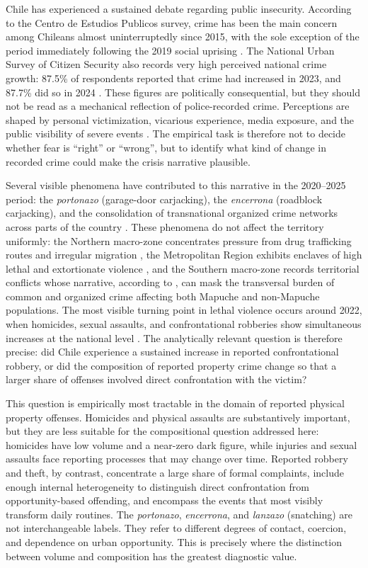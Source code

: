 \documentclass[pdflatex,sn-basic]{sn-jnl}
\begin{document}
Chile has experienced a sustained debate regarding public insecurity. According to the Centro de Estudios Publicos survey, crime has been the main concern among Chileans almost uninterruptedly since 2015, with the sole exception of the period immediately following the 2019 social uprising \citep{cep2025}. The National Urban Survey of Citizen Security also records very high perceived national crime growth: 87.5\% of respondents reported that crime had increased in 2023, and 87.7\% did so in 2024 \citep{ine2025enusc}. These figures are politically consequential, but they should not be read as a mechanical reflection of police-recorded crime. Perceptions are shaped by personal victimization, vicarious experience, media exposure, and the public visibility of severe events \citep{dominguez2024,gamarra2024b}. The empirical task is therefore not to decide whether fear is ``right'' or ``wrong'', but to identify what kind of change in recorded crime could make the crisis narrative plausible.

Several visible phenomena have contributed to this narrative in the 2020--2025 period: the \textit{portonazo} (garage-door carjacking), the \textit{encerrona} (roadblock carjacking), and the consolidation of transnational organized crime networks across parts of the country \citep{greene2023,bravo2024}. These phenomena do not affect the territory uniformly: the Northern macro-zone concentrates pressure from drug trafficking routes and irregular migration \citep{bravo2024}, the Metropolitan Region exhibits enclaves of high lethal and extortionate violence \citep{dammert2025}, and the Southern macro-zone records territorial conflicts whose narrative, according to \citet{izquierdo2024}, can mask the transversal burden of common and organized crime affecting both Mapuche and non-Mapuche populations. The most visible turning point in lethal violence occurs around 2022, when homicides, sexual assaults, and confrontational robberies show simultaneous increases at the national level \citep{crespo2023}. The analytically relevant question is therefore precise: did Chile experience a sustained increase in reported confrontational robbery, or did the composition of reported property crime change so that a larger share of offenses involved direct confrontation with the victim?

This question is empirically most tractable in the domain of reported physical property offenses. Homicides and physical assaults are substantively important, but they are less suitable for the compositional question addressed here: homicides have low volume and a near-zero dark figure, while injuries and sexual assaults face reporting processes that may change over time. Reported robbery and theft, by contrast, concentrate a large share of formal complaints, include enough internal heterogeneity to distinguish direct confrontation from opportunity-based offending, and encompass the events that most visibly transform daily routines. The \textit{portonazo}, \textit{encerrona}, and \textit{lanzazo} (snatching) are not interchangeable labels. They refer to different degrees of contact, coercion, and dependence on urban opportunity. This is precisely where the distinction between volume and composition has the greatest diagnostic value.
\end{document}
